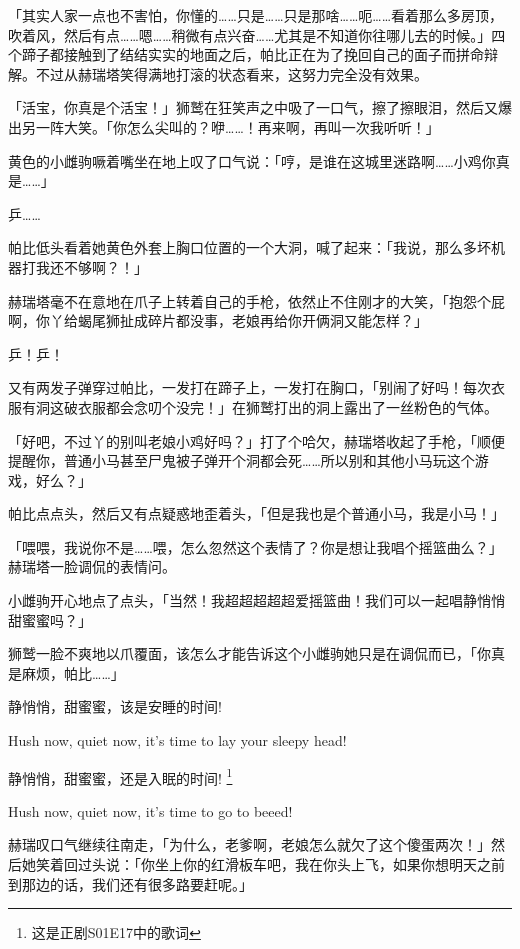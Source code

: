 「其实人家一点也不害怕，你懂的……只是……只是那啥……呃……看着那么多房顶，吹着风，然后有点……嗯……稍微有点兴奋……尤其是不知道你往哪儿去的时候。」四个蹄子都接触到了结结实实的地面之后，帕比正在为了挽回自己的面子而拼命辩解。不过从赫瑞塔笑得满地打滚的状态看来，这努力完全没有效果。

「活宝，你真是个活宝！」狮鹫在狂笑声之中吸了一口气，擦了擦眼泪，然后又爆出另一阵大笑。「你怎么尖叫的？咿……！再来啊，再叫一次我听听！」

黄色的小雌驹噘着嘴坐在地上叹了口气说：「哼，是谁在这城里迷路啊……小鸡你真是……」

乒……

帕比低头看着她黄色外套上胸口位置的一个大洞，喊了起来：「我说，那么多坏机器打我还不够啊？！」

赫瑞塔毫不在意地在爪子上转着自己的手枪，依然止不住刚才的大笑，「抱怨个屁啊，你丫给蝎尾狮扯成碎片都没事，老娘再给你开俩洞又能怎样？」

乒！乒！

又有两发子弹穿过帕比，一发打在蹄子上，一发打在胸口，「别闹了好吗！每次衣服有洞这破衣服都会念叨个没完！」在狮鹫打出的洞上露出了一丝粉色的气体。

「好吧，不过丫的别叫老娘小鸡好吗？」打了个哈欠，赫瑞塔收起了手枪，「顺便提醒你，普通小马甚至尸鬼被子弹开个洞都会死……所以别和其他小马玩这个游戏，好么？」

帕比点点头，然后又有点疑惑地歪着头，「但是我也是个普通小马，我是小马！」

「喂喂，我说你不是……喂，怎么忽然这个表情了？你是想让我唱个摇篮曲么？」赫瑞塔一脸调侃的表情问。

小雌驹开心地点了点头，「当然！我超超超超超爱摇篮曲！我们可以一起唱静悄悄甜蜜蜜吗？」

狮鹫一脸不爽地以爪覆面，该怎么才能告诉这个小雌驹她只是在调侃而已，「你真是麻烦，帕比……」

\begin{song}
静悄悄，甜蜜蜜，该是安睡的时间!

Hush now, quiet now, it's time to lay your sleepy head!

\medskip

静悄悄，甜蜜蜜，还是入眠的时间! \footnote{这是正剧S01E17中的歌词}

Hush now, quiet now, it's time to go to beeed!
\end{song}

赫瑞叹口气继续往南走，「为什么，老爹啊，老娘怎么就欠了这个傻蛋两次！」然后她笑着回过头说：「你坐上你的红滑板车吧，我在你头上飞，如果你想明天之前到那边的话，我们还有很多路要赶呢。」

